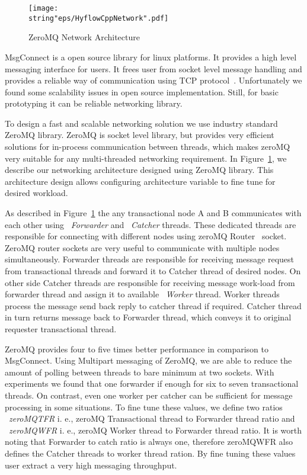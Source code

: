 \documentclass[12pt,english]{report}
\begin{document}
\begin{figure}
\begin{minipage}[b]{0.9\linewidth}\centering
\centering \texttt{[image: \\string"eps/HyflowCppNetwork".pdf]}
\caption{ZeroMQ Network Architecture}
\label{Fig:HyflowCppNetwork}
\end{minipage}
\end{figure}

MsgConnect is a open source library for linux platforms. It provides a high level messaging interface for users. It frees user from socket level message handling and provides a reliable way of communication using TCP protocol~\cite{forouzan2002tcp}. Unfortunately we found some scalability issues in open source implementation. Still, for basic prototyping it can be reliable networking library.

To design a fast and scalable networking solution we use industry standard ZeroMQ library. ZeroMQ is socket level library, but provides very efficient solutions for in-process communication between threads, which makes zeroMQ very suitable for any multi-threaded networking requirement. In Figure~\ref{Fig:HyflowCppNetwork}, we describe our networking architecture designed using ZeroMQ library. This architecture design allows configuring architecture variable to fine tune for desired workload. 

As described in Figure~\ref{Fig:HyflowCppNetwork} the any transactional node A and B communicates with each other using ~\emph{Forwarder} and ~\emph{Catcher} threads. These dedicated threads are responsible for connecting with different nodes using zeroMQ Router~\cite{hintjens2011omq} socket. ZeroMQ router sockets are very useful to communicate with multiple nodes simultaneously. Forwarder threads are responsible for receiving message request from transactional threads and forward it to Catcher thread of desired nodes. On other side Catcher threads are responsible for receiving message work-load from forwarder thread and assign it to available ~\emph{Worker} thread. Worker threads process the message send back reply to catcher thread if required. Catcher thread in turn returns message back to Forwarder thread, which conveys it to original requester transactional thread.

ZeroMQ provides four to five times better performance in comparison to MsgConnect. Using Multipart messaging of ZeroMQ, we are able to reduce the amount of polling between threads to bare minimum at two sockets. With experiments we found that one forwarder if enough for six to seven transactional threads. On contrast, even one worker per catcher can be sufficient for message processing in some situations. To fine tune these values, we define two ratios ~\emph{zeroMQTFR} i. e., zeroMQ Transactional thread to Forwarder thread ratio and ~\emph{zeroMQWFR} i. e., zeroMQ Worker thread to Forwarder thread ratio. It is worth noting that Forwarder to catch ratio is always one, therefore zeroMQWFR also defines the Catcher threads to worker thread ration. By fine tuning these values user extract a very high messaging throughput.
\end{document}
